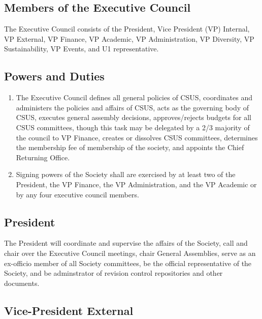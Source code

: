 \subsection{Members of the Executive
Council}\label{members-of-the-executive-council}

The Executive Council consists of the President, Vice President (VP)
Internal, VP External, VP Finance, VP Academic, VP Administration, VP
Diversity, VP Sustainability, VP Events, and U1 representative.

\subsection{Powers and Duties}\label{powers-and-duties}

\begin{enumerate}
\def\labelenumi{\arabic{enumi}.}
\item
  The Executive Council defines all general policies of CSUS,
  coordinates and administers the policies and affairs of CSUS, acts as
  the governing body of CSUS, executes general assembly decisions,
  approves/rejects budgets for all CSUS committees, though this task may
  be delegated by a 2/3 majority of the council to VP Finance, creates
  or dissolves CSUS committees, determines the membership fee of
  membership of the society, and appoints the Chief Returning Office.
\item
  Signing powers of the Society shall are exercised by at least two of
  the President, the VP Finance, the VP Administration, and the VP
  Academic or by any four executive council members.
\end{enumerate}

\subsection{President}\label{president}

The President will coordinate and supervise the affairs of the Society,
call and chair over the Executive Council meetings, chair General
Assemblies, serve as an ex-officio member of all Society committees, be
the official representative of the Society, and be adminstrator of
revision control repositories and other documents.

\subsection{Vice-President External}\label{vice-president-external}

